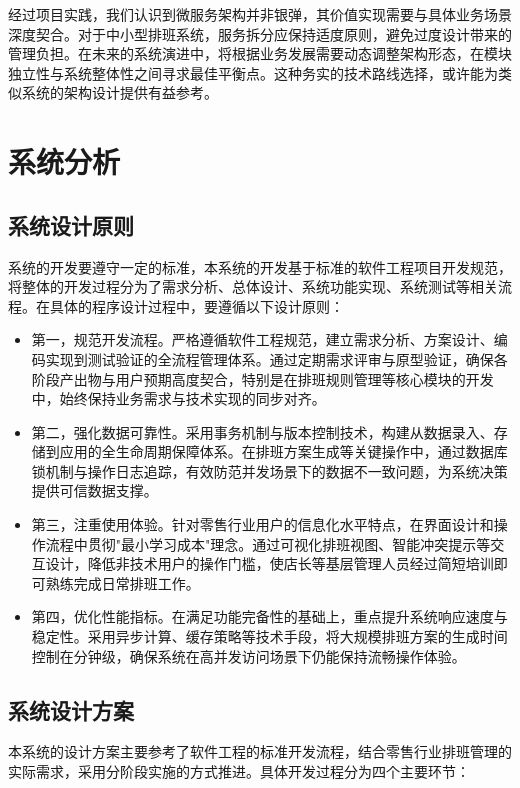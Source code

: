 \documentclass{ctexart}
\begin{document}
经过项目实践，我们认识到微服务架构并非银弹，其价值实现需要与具体业务场景深度契合。对于中小型排班系统，服务拆分应保持适度原则，避免过度设计带来的管理负担。在未来的系统演进中，将根据业务发展需要动态调整架构形态，在模块独立性与系统整体性之间寻求最佳平衡点。这种务实的技术路线选择，或许能为类似系统的架构设计提供有益参考。

\section{系统分析}
\subsection{系统设计原则}
系统的开发要遵守一定的标准，本系统的开发基于标准的软件工程项目开发规范，将整体的开发过程分为了需求分析、总体设计、系统功能实现、系统测试等相关流程。在具体的程序设计过程中，要遵循以下设计原则：
\begin{itemize}
    \item 第一，规范开发流程。严格遵循软件工程规范，建立需求分析、方案设计、编码实现到测试验证的全流程管理体系。通过定期需求评审与原型验证，确保各阶段产出物与用户预期高度契合，特别是在排班规则管理等核心模块的开发中，始终保持业务需求与技术实现的同步对齐。
    
    \item 第二，强化数据可靠性。采用事务机制与版本控制技术，构建从数据录入、存储到应用的全生命周期保障体系。在排班方案生成等关键操作中，通过数据库锁机制与操作日志追踪，有效防范并发场景下的数据不一致问题，为系统决策提供可信数据支撑。
    
    \item 第三，注重使用体验。针对零售行业用户的信息化水平特点，在界面设计和操作流程中贯彻"最小学习成本"理念。通过可视化排班视图、智能冲突提示等交互设计，降低非技术用户的操作门槛，使店长等基层管理人员经过简短培训即可熟练完成日常排班工作。
    
    \item 第四，优化性能指标。在满足功能完备性的基础上，重点提升系统响应速度与稳定性。采用异步计算、缓存策略等技术手段，将大规模排班方案的生成时间控制在分钟级，确保系统在高并发访问场景下仍能保持流畅操作体验。
\end{itemize}

\subsection{系统设计方案}
本系统的设计方案主要参考了软件工程的标准开发流程，结合零售行业排班管理的实际需求，采用分阶段实施的方式推进。具体开发过程分为四个主要环节：
\end{document}
